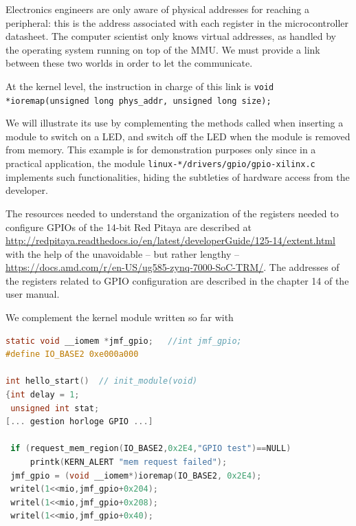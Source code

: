 \documentclass{article}
\begin{document}
{{{Electronics engineers are only aware of physical addresses for reaching a peripheral: this is
the address associated with each register in the microcontroller datasheet. The computer
scientist only knows virtual addresses, as handled by the operating system running on top of the
MMU. We must provide a link between these two worlds in order to let the communicate.

At the kernel level, the instruction \cite[chap.9]{ldd3} in charge of this link is
{\tt void *ioremap(unsigned long phys\_addr, unsigned long size);}

We will illustrate its use by complementing the methods called when inserting a module
to switch on a LED, and switch off the LED when the module is removed from memory. This example
is for demonstration purposes only since in a practical application, the module
{\tt linux-*/drivers/gpio/gpio-xilinx.c} implements such functionalities, hiding the subtleties
of hardware access from the developer.

The resources needed to understand the organization of the registers needed to configure
GPIOs of the 14-bit Red Pitaya are described at
\url{http://redpitaya.readthedocs.io/en/latest/developerGuide/125-14/extent.html}
with the help of the unavoidable -- but rather lengthy -- 
\url{https://docs.amd.com/r/en-US/ug585-zynq-7000-SoC-TRM/}.
The addresses of the registers related to GPIO configuration are described in the chapter 14
of the user manual.

We complement the kernel module written so far with
\begin{lstlisting}[language=C]
static void __iomem *jmf_gpio;   //int jmf_gpio;
#define IO_BASE2 0xe000a000

int hello_start()  // init_module(void) 
{int delay = 1;
 unsigned int stat;
[... gestion horloge GPIO ...]

 if (request_mem_region(IO_BASE2,0x2E4,"GPIO test")==NULL)
     printk(KERN_ALERT "mem request failed");
 jmf_gpio = (void __iomem*)ioremap(IO_BASE2, 0x2E4);
 writel(1<<mio,jmf_gpio+0x204);
 writel(1<<mio,jmf_gpio+0x208);
 writel(1<<mio,jmf_gpio+0x40);


\end{lstlisting}}}}
\end{document}
